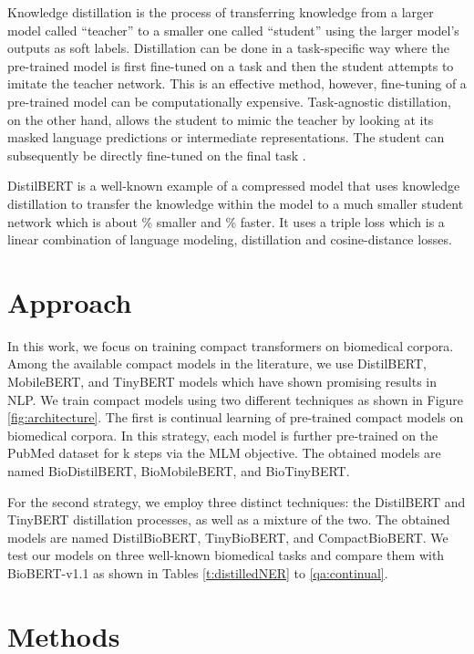 \documentclass{article}
\begin{document}
Knowledge distillation \citep{hinton2015distilling} is the process of transferring knowledge from a larger model called ``teacher'' to a smaller one called ``student'' using the larger model's outputs as soft labels. Distillation can be done in a task-specific way where the pre-trained model is first fine-tuned on a task and then the student attempts to imitate the teacher network. This is an effective method, however, fine-tuning of a pre-trained model can be computationally expensive. Task-agnostic distillation, on the other hand, allows the student to mimic the teacher by looking at its masked language predictions or intermediate representations. The student can subsequently be directly fine-tuned on the final task \citep{wang2020minilm, yao2021adapt}. 

DistilBERT is a well-known example of a compressed model that uses knowledge distillation to transfer the knowledge within the  model to a much smaller student network which is about \% smaller and \% faster. It uses a triple loss which is a linear combination of language modeling, distillation and cosine-distance losses.





\section{Approach}

In this work, we focus on training compact transformers on biomedical corpora. Among the available compact models in the literature, we use DistilBERT, MobileBERT, and TinyBERT models which have shown promising results in NLP. We train compact models using two different techniques as shown in Figure \ref{fig:architecture}. The first is continual learning of pre-trained compact models on biomedical corpora. In this strategy, each  model is further pre-trained on the PubMed dataset for k steps via the MLM objective. The obtained models are named BioDistilBERT, BioMobileBERT, and BioTinyBERT.

For the second strategy, we employ three distinct techniques: the DistilBERT and TinyBERT distillation processes, as well as a mixture of the two. The obtained models  are named DistilBioBERT, TinyBioBERT, and CompactBioBERT. We test our models on three well-known biomedical tasks and compare them with BioBERT-v1.1 as shown in Tables \ref{t:distilledNER} to \ref{qa:continual}.

\section{Methods}
\end{document}

